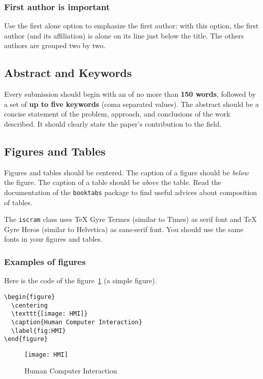 \documentclass[]{iscram}
\newcommand\macro[1]{{\textcolor{macro color}{\ttfamily\bfseries\string#1}}}
\newcommand\option[1]{\textcolor{option color}{\ttfamily#1}}
\begin{document}
\subsubsection{First author is important}

Use the \option{first alone} option to emphasize the first author: with
this option, the first author (and its affiliation) is alone on its line
just below the title. The others authors are grouped two by two.

\subsection{Abstract and Keywords}

Every submission should begin with an \macro{\abstract} of no more than
\textbf{150 words}, followed by a set of \textbf{up to five keywords}
(coma separated values). The abstract should be a concise statement of
the problem, approach, and conclusions of the work described. It should
clearly state the paper's contribution to the field.

\subsection{Figures and Tables}

Figures and tables should be centered. The caption of a figure should be
\emph{below} the figure. The caption of a table should be \emph{above}
the table. Read the documentation of the \texttt{booktabs} package to
find useful advices about composition of tables.

The \texttt{iscram} class uses TeX Gyre Termes (similar to Times) as
serif font and TeX Gyre Heros (similar to Helvetica) as sans-serif
font. You should use the same fonts in your figures and tables.

\subsubsection{Examples of figures}

Here is the code of the figure~\ref{fig:HMI} (a simple figure).

\begin{lstlisting}[style=TeX]
\begin{figure}
  \centering
  \texttt{[image: HMI]}
  \caption{Human Computer Interaction}
  \label{fig:HMI}
\end{figure}
\end{lstlisting}
\begin{figure}
  \centering \texttt{[image: HMI]}
  \caption{Human Computer Interaction}
  \label{fig:HMI}
\end{figure}
\end{document}
